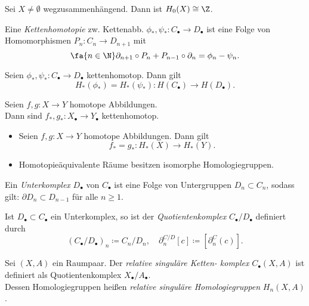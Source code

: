 \documentclass{cheat-sheet}
\newcommand{\CC}[1]{{#1}_{\bullet}} %
\begin{document}
\begin{prop}
  Sei $X \not= \emptyset$ wegzusammenhängend. Dann ist $H_0(X) \cong \Z$.
\end{prop}

\begin{defn}
  Eine \emph{Kettenhomotopie} zw. Kettenabb. $\phi_*, \psi_* : \CC{C} \to \CC{D}$ ist eine Folge von Homomorphismen $P_n : C_n \to D_{n+1}$ mit
  \[ \fa{n \in \N} \partial_{n+1} \circ P_n + P_{n-1} \circ \partial_n = \phi_n - \psi_n. \]
\end{defn}

\begin{prop}
  Seien $\phi_*, \psi_* : \CC{C} \to \CC{D}$ kettenhomotop. Dann gilt
  \[ H_*(\phi_*) = H_*(\psi_*) : H(\CC{C}) \to H(\CC{D}). \]
\end{prop}

\begin{satz}
  Seien $f, g : X \to Y$ homotope Abbildungen. \\
  Dann sind $f_*, g_* : \CC{X} \to \CC{Y}$ kettenhomotop.
\end{satz}

\begin{kor}
  \begin{itemize}
    \item Seien $f, g : X \to Y$ homotope Abbildungen. Dann gilt
    \[ f_* = g_* : H_*(X) \to H_*(Y). \]
    \item Homotopieäquivalente Räume besitzen isomorphe Homologiegruppen.
  \end{itemize}
\end{kor}



\begin{defn}
  Ein \emph{Unterkomplex} $\CC{D}$ von $\CC{C}$ ist eine Folge von Untergruppen $D_n \subset C_n$, sodass gilt: $\partial D_n \subset D_{n-1}$ für alle $n \geq 1$.
\end{defn}

\begin{defn}
  Ist $\CC{D} \subset \CC{C}$ ein Unterkomplex, so ist der \emph{Quotientenkomplex} $\CC{C}/\CC{D}$ definiert durch
  \[
    (\CC{C}/\CC{D})_n \coloneqq C_n/D_n, \quad
    \partial^{C/D}_n[c] \coloneqq [\partial^C_n(c)].
  \]
\end{defn}

\begin{defn}
  Sei $(X, A)$ ein Raumpaar. Der \emph{relative singuläre Ketten- komplex} $\CC{C}(X, A)$ ist definiert als Quotientenkomplex $\CC{X}/\CC{A}$.\\
  Dessen Homologiegruppen heißen \emph{relative singuläre Homologiegruppen} $H_n(X, A)$.
\end{defn}
\end{document}
